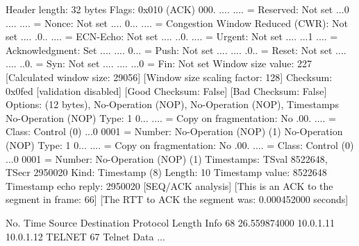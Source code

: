    Header length: 32 bytes
    Flags: 0x010 (ACK)
        000. .... .... = Reserved: Not set
        ...0 .... .... = Nonce: Not set
        .... 0... .... = Congestion Window Reduced (CWR): Not set
        .... .0.. .... = ECN-Echo: Not set
        .... ..0. .... = Urgent: Not set
        .... ...1 .... = Acknowledgment: Set
        .... .... 0... = Push: Not set
        .... .... .0.. = Reset: Not set
        .... .... ..0. = Syn: Not set
        .... .... ...0 = Fin: Not set
    Window size value: 227
    [Calculated window size: 29056]
    [Window size scaling factor: 128]
    Checksum: 0x0fed [validation disabled]
        [Good Checksum: False]
        [Bad Checksum: False]
    Options: (12 bytes), No-Operation (NOP), No-Operation (NOP), Timestamps
        No-Operation (NOP)
            Type: 1
                0... .... = Copy on fragmentation: No
                .00. .... = Class: Control (0)
                ...0 0001 = Number: No-Operation (NOP) (1)
        No-Operation (NOP)
            Type: 1
                0... .... = Copy on fragmentation: No
                .00. .... = Class: Control (0)
                ...0 0001 = Number: No-Operation (NOP) (1)
        Timestamps: TSval 8522648, TSecr 2950020
            Kind: Timestamp (8)
            Length: 10
            Timestamp value: 8522648
            Timestamp echo reply: 2950020
    [SEQ/ACK analysis]
        [This is an ACK to the segment in frame: 66]
        [The RTT to ACK the segment was: 0.000452000 seconds]

No.     Time           Source                Destination           Protocol Length Info
     68 26.559874000   10.0.1.11             10.0.1.12             TELNET   67     Telnet Data ...

